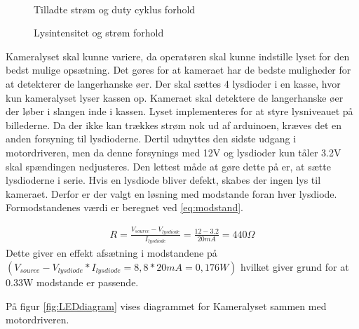 \begin{figure}[htbp]
\begin{minipage}[b]{0.48\textwidth}
\end{minipage} \\ %
\begin{minipage}[t]{0.48\textwidth}
\caption{Tilladte strøm og duty cyklus forhold} %
\label{fig:LED1}
\end{minipage} \hfill
\begin{minipage}[t]{0.48\textwidth}
\caption{Lysintensitet og strøm forhold} %
\label{fig:LED2}
\end{minipage}
\end{figure}

 Kameralyset skal kunne variere, da operatøren skal kunne indstille lyset for den bedst mulige opsætning. Det gøres for at kameraet har de bedste muligheder for at detekterer de langerhanske øer. Der skal sættes 4 lysdioder i en kasse, hvor kun kameralyset lyser kassen op. Kameraet skal detektere de langerhanske øer der løber i slangen inde i kassen. Lyset implementeres for at styre lysniveauet på billederne. Da der ikke kan trækkes strøm nok ud af arduinoen, kræves det en anden forsyning til lysdioderne. Dertil udnyttes den sidste udgang i motordriveren, men da denne forsynings med 12V og lysdioder kun tåler 3.2V skal spændingen nedjusteres. Den lettest måde at gøre dette på er, at sætte lysdioderne i serie. Hvis en lysdiode bliver defekt, skabes der ingen lys til kameraet. Derfor er der valgt en løsning med modstande foran hver lysdiode. Formodstandenes værdi er beregnet ved \ref{eq:modstand}. 

\begin{align}
R=\frac{V_{source}-V_{lysdiode}}{I_{lysdiode}}=\frac{12-3.2}{20mA}=440\Omega
\label{eq:modstand}
\end{align} 
Dette giver en effekt afsætning i modstandene på $(V_{source}-V_{lysdiode}*I_{lysdiode}=8,8*20mA=0,176W)$ hvilket giver grund for at 0.33W modstande er passende.

På figur \ref{fig:LEDdiagram} vises diagrammet for Kameralyset sammen med motordriveren.
 
